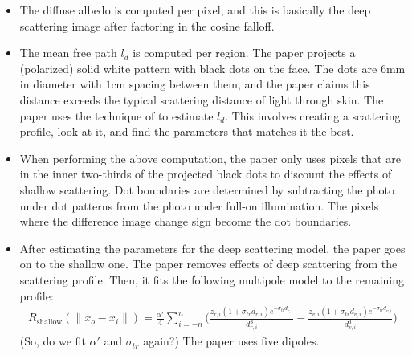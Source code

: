 \documentclass[10pt]{article}
\begin{document}
\begin{itemize}
      \item The diffuse albedo is computed per pixel, and this is basically the deep scattering image after factoring in the cosine falloff.

      \item The mean free path $l_d$ is computed per region.  The paper projects a (polarized) solid white pattern with black dots on the face.  The dots are $6$mm in diameter with $1$cm spacing between them, and the paper claims this distance exceeds the typical scattering distance of light through skin.  The paper uses the technique of \cite{Tariq:2006} to estimate $l_d$.  This involves creating a scattering profile, look at it, and find the parameters that matches it the best.

      \item When performing the above computation, the paper only uses pixels that are in the inner two-thirds of the projected black dots to discount the effects of shallow scattering.  Dot boundaries are determined by subtracting the photo under dot patterns from the photo under full-on illumination.  The pixels where the difference image change sign become the dot boundaries.

      \item After estimating the parameters for the deep scattering model, the paper goes on to the shallow one.  The paper removes effects of deep scattering from the scattering profile.  Then, it fits the following multipole model to the remaining profile:
      \begin{align*}
        R_{\mathrm{shallow}}(\| x_o - x_i \|) = \frac{\alpha'}{4} \sum_{i=-n}^n \bigg( \frac{z_{r,i}(1 + \sigma_{tr} d_{r,i})e^{-\sigma_{tr} d_{r,i}}}{d_{r,i}^3} - \frac{z_{v,i}(1 + \sigma_{tr} d_{v,i})e^{-\sigma_{tr} d_{v,i}}}{d_{v,i}^3} \bigg)
      \end{align*}
      (So, do we fit $\alpha'$ and $\sigma_{tr}$ again?)  The paper uses five dipoles.
  	\end{itemize}

    \section{\cite{Ghosh:2010}}
\end{document}
